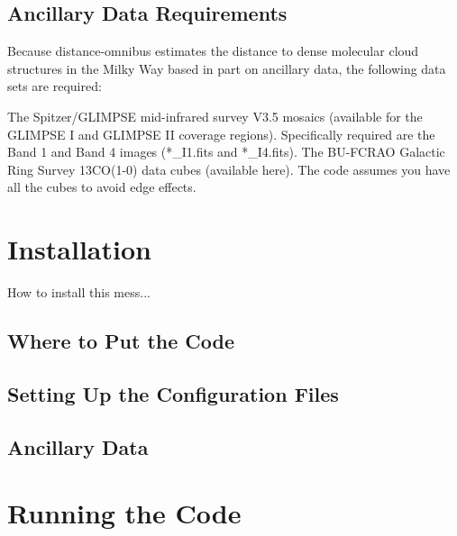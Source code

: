 \documentclass[11pt]{amsart}
\begin{document}
\subsection{Ancillary Data Requirements}

Because distance-omnibus estimates the distance to dense molecular cloud structures in the Milky Way based in part on ancillary data, the following data sets are required:

    The Spitzer/GLIMPSE mid-infrared survey V3.5 mosaics (available for the GLIMPSE I and GLIMPSE II coverage regions). Specifically required are the Band 1 and Band 4 images (*\_I1.fits and *\_I4.fits).
    The BU-FCRAO Galactic Ring Survey 13CO(1-0) data cubes (available here). The code assumes you have all the cubes to avoid edge effects.


\section{Installation}

How to install this mess...


\subsection{Where to Put the Code}

\subsection{Setting Up the Configuration Files}

\subsection{Ancillary Data}



\section{Running the Code}
\end{document}
